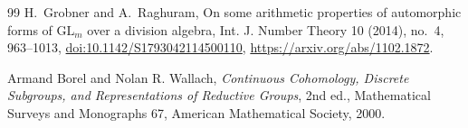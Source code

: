\documentclass[11pt]{amsart}
\theoremstyle{definition}
\theoremstyle{remark}
\begin{document}
\begin{thebibliography}{99}
H.~Grobner and A.~Raghuram, On some arithmetic properties of automorphic
forms of \(\mathrm{GL}_m\) over a division algebra, Int. J. Number Theory
10 (2014), no.~4, 963--1013, \href{https://doi.org/10.1142/S1793042114500110}
{doi:10.1142/S1793042114500110}, \url{https://arxiv.org/abs/1102.1872}.

Armand Borel and Nolan R. Wallach, \emph{Continuous Cohomology, Discrete
Subgroups, and Representations of Reductive Groups}, 2nd ed., Mathematical
Surveys and Monographs 67, American Mathematical Society, 2000.

\end{thebibliography}
\end{document}
